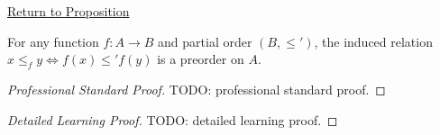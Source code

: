 \newpage
{}
\label{prf:induced-preorder}

\begin{remark*}[Return]
\hyperref[prop:induced-preorder]{Return to Proposition}
\end{remark*}

\begin{proposition*}
For any function $f : A \to B$ and partial order $(B,\leq')$, the induced
relation $x \leq_f y \Longleftrightarrow f(x)\leq' f(y)$ is a preorder on $A$.
\end{proposition*}

\begin{proof}[Professional Standard Proof]
\LRAProofBodyStart
TODO: professional standard proof.
\end{proof}

\begin{proof}[Detailed Learning Proof]
\LRAProofBodyStart
TODO: detailed learning proof.
\end{proof}

\begin{remark*}
\end{remark*}

\NoLocalDependencies

\clearpage
